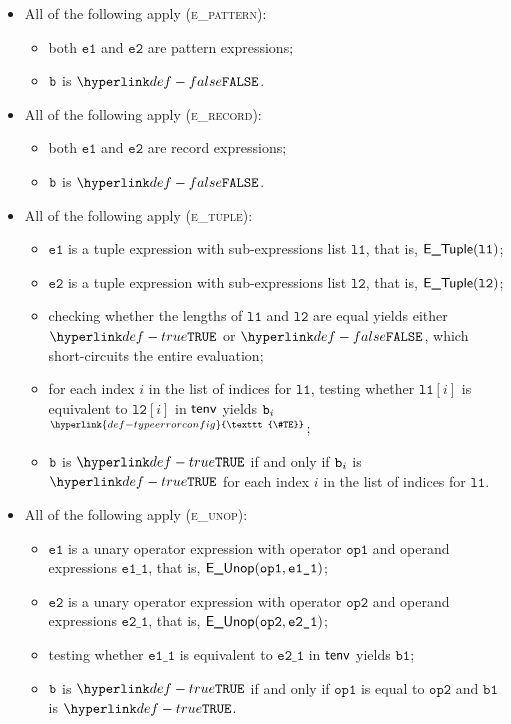 \documentclass{book}
\newcommand\TypeErrorConfig[0]{\hyperlink{def-typeerrorconfig}{\texttt{\#TE}}}
\newcommand\ProseOrTypeError[0]{\hyperlink{def-proseortypeerror}{$^{\TypeErrorConfig}$}}
\newcommand\veone[0]{\texttt{e1}}
\newcommand\vetwo[0]{\texttt{e2}}
\newcommand\opone[0]{\texttt{op1}}
\newcommand\optwo[0]{\texttt{op2}}
\newcommand\veoneone[0]{\texttt{e1\_1}}
\newcommand\vetwoone[0]{\texttt{e2\_1}}
\newcommand\vbone[0]{\texttt{b1}}
\newcommand\vlone[0]{\texttt{l1}}
\newcommand\vltwo[0]{\texttt{l2}}
\begin{document}
\begin{itemize}
  \item All of the following apply (\textsc{e\_pattern}):
  \begin{itemize}
    \item both $\veone$ and $\vetwo$ are pattern expressions;
    \item $\texttt{b}$ is $\False$.
  \end{itemize}

  \item All of the following apply (\textsc{e\_record}):
  \begin{itemize}
    \item both $\veone$ and $\vetwo$ are record expressions;
    \item $\texttt{b}$ is $\False$.
  \end{itemize}

  \item All of the following apply (\textsc{e\_tuple}):
  \begin{itemize}
    \item $\veone$ is a tuple expression with sub-expressions list $\vlone$,
          that is, $\ETuple(\vlone)$;
    \item $\vetwo$ is a tuple expression with sub-expressions list $\vltwo$,
          that is, $\ETuple(\vltwo)$;
    \item checking whether the lengths of $\vlone$ and $\vltwo$ are equal yields either $\True$ or $\False$, which short-circuits
          the entire evaluation;
    \item for each index $i$ in the list of indices for $\vlone$, testing whether $\vlone[i]$ is equivalent to $\vltwo[i]$
          in $\textsf{tenv}$ yields $\texttt{b}_i$ \ProseOrTypeError;
    \item $\texttt{b}$ is $\True$ if and only if $\texttt{b}_i$ is $\True$ for each index $i$ in the list of indices for $\vlone$.
  \end{itemize}

  \item All of the following apply (\textsc{e\_unop}):
  \begin{itemize}
    \item $\veone$ is a unary operator expression with operator $\opone$ and operand expressions $\veoneone$,
          that is, $\EUnop(\opone, \veoneone)$;
    \item $\vetwo$ is a unary operator expression with operator $\optwo$ and operand expressions $\vetwoone$,
          that is, $\EUnop(\optwo, \vetwoone)$;
    \item testing whether $\veoneone$ is equivalent to $\vetwoone$ in $\textsf{tenv}$ yields $\vbone$;
    \item $\texttt{b}$ is $\True$ if and only if $\opone$ is equal to $\optwo$ and $\vbone$ is $\True$.
  \end{itemize}


\end{itemize}
\end{document}
